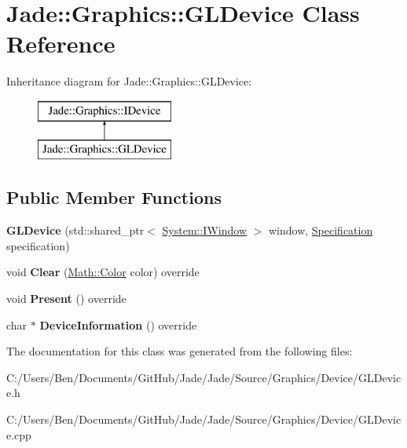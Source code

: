 \hypertarget{class_jade_1_1_graphics_1_1_g_l_device}{}\section{Jade\+:\+:Graphics\+:\+:G\+L\+Device Class Reference}
\label{class_jade_1_1_graphics_1_1_g_l_device}
Inheritance diagram for Jade\+:\+:Graphics\+:\+:G\+L\+Device\+:\begin{figure}[H]
\begin{center}
\leavevmode
\includegraphics[height=2.000000cm]{class_jade_1_1_graphics_1_1_g_l_device}
\end{center}
\end{figure}
\subsection*{Public Member Functions}
\begin{DoxyCompactItemize}
\item 
\hypertarget{class_jade_1_1_graphics_1_1_g_l_device_af62110c6a84a1ef415f1ae17a2a78424}{}{\bfseries G\+L\+Device} (std\+::shared\+\_\+ptr$<$ \hyperlink{struct_jade_1_1_system_1_1_i_window}{System\+::\+I\+Window} $>$ window, \hyperlink{struct_jade_1_1_graphics_1_1_specification}{Specification} specification)\label{class_jade_1_1_graphics_1_1_g_l_device_af62110c6a84a1ef415f1ae17a2a78424}

\item 
\hypertarget{class_jade_1_1_graphics_1_1_g_l_device_a3787d704d6525c4bee4ed0596a83f739}{}void {\bfseries Clear} (\hyperlink{struct_jade_1_1_math_1_1_color}{Math\+::\+Color} color) override\label{class_jade_1_1_graphics_1_1_g_l_device_a3787d704d6525c4bee4ed0596a83f739}

\item 
\hypertarget{class_jade_1_1_graphics_1_1_g_l_device_a427a46a9d12fac4d130cf8dc656fb13d}{}void {\bfseries Present} () override\label{class_jade_1_1_graphics_1_1_g_l_device_a427a46a9d12fac4d130cf8dc656fb13d}

\item 
\hypertarget{class_jade_1_1_graphics_1_1_g_l_device_a17c8e8a20dc5689bc231fc3ead268be1}{}char $\ast$ {\bfseries Device\+Information} () override\label{class_jade_1_1_graphics_1_1_g_l_device_a17c8e8a20dc5689bc231fc3ead268be1}

\end{DoxyCompactItemize}


The documentation for this class was generated from the following files\+:\begin{DoxyCompactItemize}
\item 
C\+:/\+Users/\+Ben/\+Documents/\+Git\+Hub/\+Jade/\+Jade/\+Source/\+Graphics/\+Device/G\+L\+Device.\+h\item 
C\+:/\+Users/\+Ben/\+Documents/\+Git\+Hub/\+Jade/\+Jade/\+Source/\+Graphics/\+Device/G\+L\+Device.\+cpp\end{DoxyCompactItemize}
